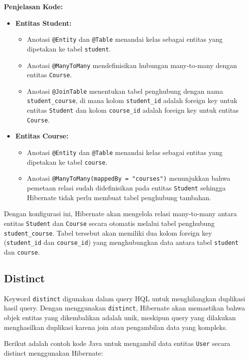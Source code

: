 \textbf{Penjelasan Kode:}
\begin{itemize}
	\item \textbf{Entitas Student:}
	\begin{itemize}
		\item Anotasi \texttt{@Entity} dan \texttt{@Table} menandai kelas sebagai entitas yang dipetakan ke tabel \texttt{student}.
		\item Anotasi \texttt{@ManyToMany} mendefinisikan hubungan many-to-many dengan entitas \texttt{Course}.
		\item Anotasi \texttt{@JoinTable} menentukan tabel penghubung dengan nama \texttt{student\_course}, di mana kolom \texttt{student\_id} adalah foreign key untuk entitas \texttt{Student} dan kolom \texttt{course\_id} adalah foreign key untuk entitas \texttt{Course}.
	\end{itemize}
	\item \textbf{Entitas Course:}
	\begin{itemize}
		\item Anotasi \texttt{@Entity} dan \texttt{@Table} menandai kelas sebagai entitas yang dipetakan ke tabel \texttt{course}.
		\item Anotasi \texttt{@ManyToMany(mappedBy = "courses")} menunjukkan bahwa pemetaan relasi sudah didefinisikan pada entitas \texttt{Student} sehingga Hibernate tidak perlu membuat tabel penghubung tambahan.
	\end{itemize}
\end{itemize}

Dengan konfigurasi ini, Hibernate akan mengelola relasi many-to-many antara entitas \texttt{Student} dan \texttt{Course} secara otomatis melalui tabel penghubung \texttt{student\_course}. Tabel tersebut akan memiliki dua kolom foreign key (\texttt{student\_id} dan \texttt{course\_id}) yang menghubungkan data antara tabel \texttt{student} dan \texttt{course}.



\subsection{Distinct}

Keyword \texttt{distinct} digunakan dalam query HQL untuk menghilangkan duplikasi hasil query. Dengan menggunakan \texttt{distinct}, Hibernate akan memastikan bahwa objek entitas yang dikembalikan adalah unik, meskipun query yang dilakukan menghasilkan duplikasi karena join atau pengambilan data yang kompleks.

Berikut adalah contoh kode Java untuk mengambil data entitas \texttt{User} secara distinct menggunakan Hibernate:

